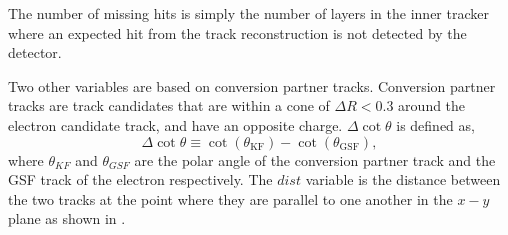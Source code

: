 The number of missing hits is simply the number of layers in the inner
tracker where an expected hit from the track reconstruction is not detected by
the detector.

Two other variables are based on conversion partner tracks.
Conversion partner tracks are track candidates that are within a cone of $\Delta
R < 0.3$ around the electron candidate track, and have an opposite charge. 
$\Delta\cot\theta$ is defined as,
\begin{equation}
\Delta \cot \theta \equiv \cot(\theta_{\text{KF}}) - \cot(\theta_{\text{{GSF}}}),
\end{equation}
where $\theta_{KF}$ and $\theta_{{GSF}}$ are the polar angle of the conversion
partner track and the {GSF} track of the electron respectively.
The $dist$ variable is the distance between the two tracks at the point where
they are parallel to one another in the $x-y$ plane as shown in
 \cite{baffioni2009identification,barge2009conversion}.
